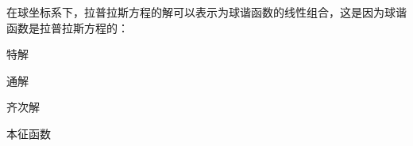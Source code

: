 \documentclass{njustexam}
\begin{document}
    \begin{problem}
      在球坐标系下，拉普拉斯方程的解可以表示为球谐函数的线性组合，这是因为球谐函数是拉普拉斯方程的：
      \begin{abcd}
      \item 特解
      \item 通解
      \item 齐次解
      \item 本征函数
      \end{abcd}
      \end{problem}









\end{document}
